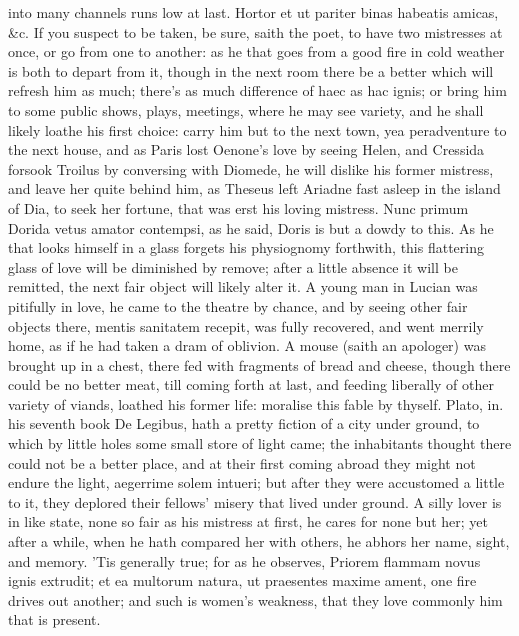 {into many channels runs low at last. Hortor et ut pariter binas
habeatis amicas, \&c. If you suspect to be taken, be sure, saith the
poet, to have two mistresses at once, or go from one to another: as he
that goes from a good fire in cold weather is both to depart from it,
though in the next room there be a better which will refresh him as
much; there's as much difference of haec as hac ignis; or bring him to
some public shows, plays, meetings, where he may see variety, and he
shall likely loathe his first choice: carry him but to the next town,
yea peradventure to the next house, and as Paris lost Oenone's love by
seeing Helen, and Cressida forsook Troilus by conversing with Diomede,
he will dislike his former mistress, and leave her quite behind him, as
Theseus left Ariadne fast asleep in the island of Dia, to seek
her fortune, that was erst his loving mistress. Nunc primum
Dorida vetus amator contempsi, as he said, Doris is but a dowdy to
this. As he that looks himself in a glass forgets his physiognomy
forthwith, this flattering glass of love will be diminished by remove;
after a little absence it will be remitted, the next fair object will
likely alter it. A young man in Lucian was pitifully in love, he
came to the theatre by chance, and by seeing other fair objects there,
mentis sanitatem recepit, was fully recovered,  and went merrily
home, as if he had taken a dram of oblivion. A mouse (saith an
apologer) was brought up in a chest, there fed with fragments of bread
and cheese, though there could be no better meat, till coming forth at
last, and feeding liberally of other variety of viands, loathed his
former life: moralise this fable by thyself. Plato, in. his seventh
book De Legibus, hath a pretty fiction of a city under ground, to
which by little holes some small store of light came; the inhabitants
thought there could not be a better place, and at their first coming
abroad they might not endure the light, aegerrime solem intueri; but
after they were accustomed a little to it, they deplored their
fellows' misery that lived under ground. A silly lover is in like
state, none so fair as his mistress at first, he cares for none but
her; yet after a while, when he hath compared her with others, he
abhors her name, sight, and memory. 'Tis generally true; for as he
observes, Priorem flammam novus ignis extrudit; et ea multorum
natura, ut praesentes maxime ament, one fire drives out another; and
such is women's weakness, that they love commonly him that is present.
}
